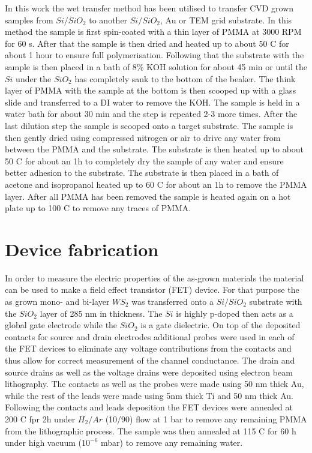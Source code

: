 In this work the wet transfer method has been utilised to transfer CVD grown samples from $Si/SiO_2$ to another $Si/SiO_2$, Au or TEM grid substrate. In this method the sample is first spin-coated with a thin layer of PMMA at 3000 RPM for 60 s. After that the sample is then dried and heated up to about 50 {\degree}C for about 1 hour to ensure full polymerisation. Following that the substrate with the sample is then placed in a bath of 8\% KOH solution for about 45 min or until the $Si$ under the $SiO_2$ has completely sank to the bottom of the beaker. The think layer of PMMA with the sample at the bottom is then scooped up with a glass slide and transferred to a DI water to remove the KOH. The sample is held in a water bath for about 30 min and the step is repeated 2-3 more times. After the last dilution step the sample is scooped onto a target substrate. The sample is then gently dried using compressed nitrogen or air to drive any water from between the PMMA and the substrate. The substrate is then heated up to about 50 {\degree}C for about an 1h to completely dry the sample of any water and ensure better adhesion to the substrate. The substrate is then placed in a bath of acetone and isopropanol heated up to 60 {\degree}C for about an 1h to remove the PMMA layer. After all PMMA has been removed the sample is heated again on a hot plate up to 100 {\degree}C to remove any traces of PMMA.

\section{Device fabrication}

In order to measure the electric properties of the as-grown materials the material can be used to make a field effect transistor (FET) device. For that purpose the as grown mono- and bi-layer $WS_2$ was transferred onto a $Si/SiO_2$ substrate with the $SiO_2$ layer of 285 nm in thickness. The $Si$ is highly p-doped then acts as a global gate electrode while the $SiO_2$ is a gate dielectric. On top of the deposited contacts for source and drain electrodes additional probes were used in each of the FET devices to eliminate any voltage contributions from the contacts and thus allow for correct measurement of the channel conductance. The drain and source drains as well as the voltage drains were deposited using electron beam lithography. The contacts as well as the probes were made using 50 nm thick Au, while the rest of the leads were made using 5nm thick Ti and 50 nm thick Au. Following the contacts and leads deposition the FET devices were annealed at 200 {\degree}C fpr 2h under $H_2/Ar$ (10/90) flow at 1 bar to remove any remaining PMMA from the lithographic process. The sample was then annealed at 115 {\degree}C for 60 h under high vacuum ($10^{-6}$ mbar) to remove any remaining water.

